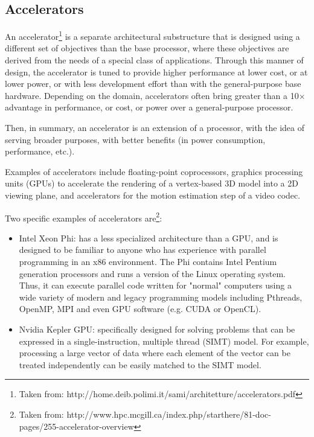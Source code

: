 \documentclass[paper=a4, fontsize=11pt]{scrartcl} %
\numberwithin{equation}{section} %
\numberwithin{figure}{section} %
\numberwithin{table}{section} %
\begin{document}
\subsection{\textbf{Accelerators}}

An accelerator\footnote{Taken from: http://home.deib.polimi.it/sami/architetture/accelerators.pdf} is a separate architectural substructure that is designed using a different set of objectives than the base processor, where these objectives are derived from the needs of a special class of applications. Through this manner of design, the accelerator is tuned to provide higher performance at lower cost, or at lower power, or with less development effort than with the general-purpose base hardware. Depending on the domain, accelerators often bring greater than a 10$\times$ advantage in performance, or cost, or power over a general-purpose processor.

Then, in summary, an accelerator is an extension of a processor, with the idea of serving broader purposes, with better benefits (in power consumption, performance, etc.).

Examples of accelerators include floating-point coprocessors, graphics processing units (GPUs) to accelerate the rendering of a vertex-based 3D model into a 2D viewing plane, and accelerators for the motion estimation step of a video codec.

Two specific examples of accelerators are\footnote{Taken from: http://www.hpc.mcgill.ca/index.php/starthere/81-doc-pages/255-accelerator-overview}:

\begin{itemize}
\item Intel Xeon Phi: has a less specialized architecture than a GPU, and is designed to be familiar to anyone who has experience with parallel programming in an x86 environment. The Phi contains Intel Pentium generation processors and runs a version of the Linux operating system. Thus, it can execute parallel code written for "normal" computers using a wide variety of modern and legacy programming models including Pthreads, OpenMP, MPI and even GPU software (e.g. CUDA or OpenCL).

\item Nvidia Kepler GPU: specifically designed for solving problems that can be expressed in a single-instruction, multiple thread (SIMT) model. For example, processing a large vector of data where each element of the vector can be treated independently can be easily matched to the SIMT model.
\end{itemize}
\end{document}

